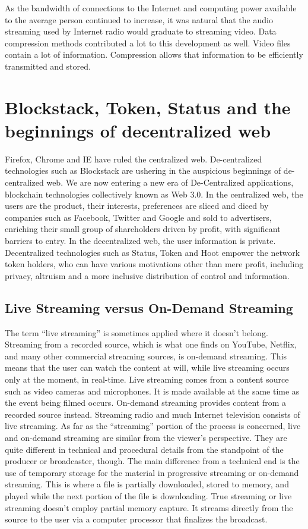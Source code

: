 \documentclass{article}
\begin{document}
As the bandwidth of connections to the Internet and computing power available to the average person continued to increase, it was natural that the audio streaming used by Internet radio would graduate to streaming video. Data compression methods contributed a lot to this development as well. Video files contain a lot of information. Compression allows that information to be efficiently transmitted and stored.


\section{Blockstack, Token, Status and the beginnings of decentralized
  web}
 Firefox, Chrome and IE have ruled the centralized web. De-centralized technologies
such as Blockstack are ushering in the auspicious beginnings of
de-centralized web. 
 We are now entering a new era of De-Centralized applications, blockchain technologies collectively known as Web 3.0. In the centralized web, the users are the product,
their interests, preferences are sliced and diced by companies such as
Facebook, Twitter and Google and sold to advertisers, enriching their
small group of shareholders driven by profit, with significant barriers to entry. In the
decentralized web, the user information is private. Decentralized
technologies such as Status, Token and Hoot empower the network token
holders, who can have various motivations other than mere profit,
including privacy, altruism and a more inclusive distribution of
control and information.


\subsection{Live Streaming versus On-Demand Streaming}
The term “live streaming” is sometimes applied where it doesn’t belong. Streaming from a recorded source, which is what one finds on YouTube, Netflix, and many other commercial streaming sources, is on-demand streaming. This means that the user can watch the content at will, while live streaming occurs only at the moment, in real-time. Live streaming comes from a content source such as video cameras and microphones. It is made available at the same time as the event being filmed occurs. On-demand streaming provides content from a recorded source instead. Streaming radio and much Internet television consists of live streaming.
As far as the “streaming” portion of the process is concerned, live and on-demand streaming are similar from the viewer’s perspective. They are quite different in technical and procedural details from the standpoint of the producer or broadcaster, though. The main difference from a technical end is the use of temporary storage for the material in progressive streaming or on-demand streaming. This is where a file is partially downloaded, stored to memory, and played while the next portion of the file is downloading. True streaming or live streaming doesn’t employ partial memory capture. It streams directly from the source to the user via a computer processor that finalizes the broadcast.
\end{document}
